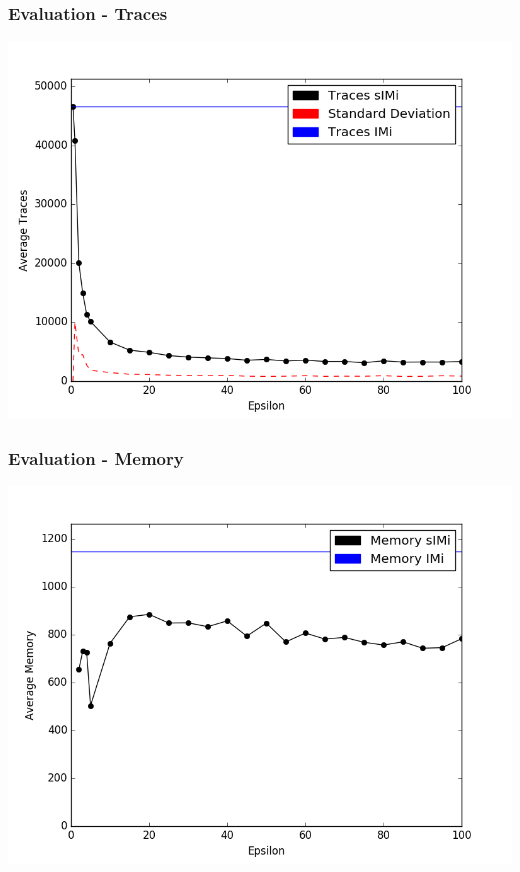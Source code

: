 \documentclass{beamer}
\begin{document}
\begin{frame}
\frametitle{Evaluation - Traces}
\centering
\includegraphics[width=0.5\linewidth]{data/BPI2014/BPI2014_lax_threshold_traces.png}
\end{frame}

\begin{frame}
\frametitle{Evaluation - Memory}
\centering
\includegraphics[width=0.5\linewidth]{data/BPI2014/BPI2014_lax_threshold_memory.png}
\end{frame}
\end{document}
